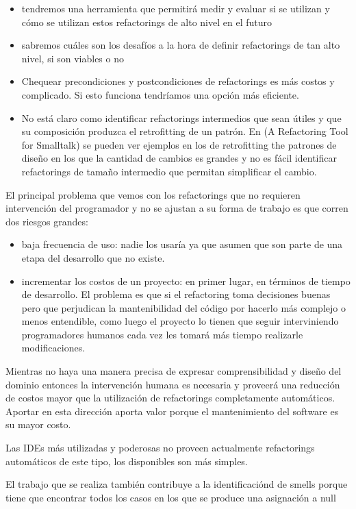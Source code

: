 \begin{itemize}
    \item tendremos una herramienta que permitirá medir y evaluar si se utilizan y cómo se utilizan
    estos refactorings de alto nivel en el futuro
    \item sabremos cuáles son los desafíos a la hora de definir refactorings de tan alto nivel, si
    son viables o no
    \item Chequear precondiciones y postcondiciones de refactorings es más costos y complicado. Si
    esto funciona tendríamos una opción más eficiente.
    \item No está claro como identificar refactorings intermedios que sean útiles y que su
    composición produzca el retrofitting de un patrón.
    En (A Refactoring Tool for Smalltalk) se pueden ver ejemplos en los de retrofitting the patrones
    de diseño en los que la cantidad de cambios es grandes y no es fácil identificar refactorings de
    tamaño intermedio que permitan simplificar el cambio.
\end{itemize}

El principal problema que vemos con los refactorings que no requieren intervención del programador y
no se ajustan a su forma de trabajo es que corren dos riesgos grandes:

\begin{itemize}
    \item baja frecuencia de uso: nadie los usaría ya que asumen que son parte de una etapa del
    desarrollo que no existe.
    \item incrementar los costos de un proyecto: en primer lugar, en términos de tiempo de
    desarrollo. El problema es que si el refactoring toma decisiones buenas pero que perjudican la
    mantenibilidad del código por hacerlo más complejo o menos entendible, como luego el proyecto lo
    tienen que seguir interviniendo programadores humanos cada vez les tomará más tiempo realizarle
    modificaciones.
\end{itemize}

Mientras no haya una manera precisa de expresar comprensibilidad y diseño del dominio entonces la
intervención humana es necesaria y proveerá una reducción de costos mayor que la utilización de
refactorings completamente automáticos. Aportar en esta dirección aporta valor porque el
mantenimiento del software es su mayor costo.

Las IDEs más utilizadas y poderosas no proveen actualmente refactorings automáticos de este tipo,
los disponibles son más simples.

El trabajo que se realiza también contribuye a la identificaciónd de smells porque tiene que
encontrar todos los casos en los que se produce una asignación a null